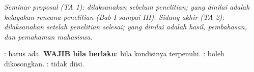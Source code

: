
{\itshape\noindent Seminar proposal (TA 1): dilaksanakan sebelum penelitian;
yang dinilai adalah kelayakan rencana penelitian (Bab I sampai III). Sidang
akhir (TA 2): dilaksanakan setelah penelitian selesai; yang dinilai adalah
hasil, pembahasan, dan pemahaman mahasiswa.\par}

\vspace{0.2cm}
{\small\singlespacing\noindent \WAJIB: harus ada.
\textcolor{merahwajib}{\textbf{WAJIB bila berlaku}}: bila kondisinya terpenuhi.
\Opsional: boleh dikosongkan. \TidakPerlu: tidak diisi.\par}

\newcommand{\cW}[1][WAJIB]{\cellcolor{bgwajib}\textcolor{merahwajib}{\textbf{#1}}}
\newcommand{\cO}{\cellcolor{bgops}\textcolor{kuningops}{\textbf{Opsional}}}
\newcommand{\cT}{\cellcolor{bgtidak}\textcolor{abuisian}{Tidak diperlukan}}

